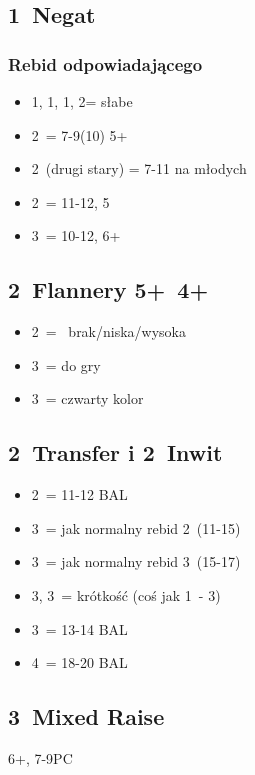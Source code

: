 \documentclass[12pt, a4paper]{article}
\begin{document}
\subsection*{1\diams\ Negat}
\subsubsection*{Rebid odpowiadającego}
\begin{itemize}
    \item 1\hearts, 1\spades, 1\nt, 2\clubs = słabe
    \item 2\diams\ = 7-9(10) 5+\diams
    \item 2\major\ (drugi stary) = 7-11 na młodych
    \item 2\nt\ = 11-12, 5\diams
    \item 3\diams\ = 10-12, 6+\diams
\end{itemize}

\subsection*{2\hearts\ Flannery 5+\spades\ 4+\hearts}
\begin{itemize}
    \item 2\nt\ = \lsf\ brak/niska/wysoka \exq
    \item 3\clubs\ = do gry
    \item 3\diams\ = czwarty kolor \gf
\end{itemize}

\subsection*{2\spades\ Transfer i 2\ntx\ Inwit}
\begin{itemize}
    \item 2\nt\ = 11-12 BAL
    \item 3\clubs\ = jak normalny rebid 2\clubs\ (11-15)
    \item 3\diams\ = jak normalny rebid 3\clubs\ (15-17) \imp
    \item 3\hearts, 3\spades\ = krótkość (coś jak 1\nt\ - 3\hearts)
    \item 3\nt\ = 13-14 BAL
    \item 4\nt\ = 18-20 BAL
\end{itemize}

\subsection*{3\clubs\ Mixed Raise}
6+\clubs, 7-9PC
\end{document}
